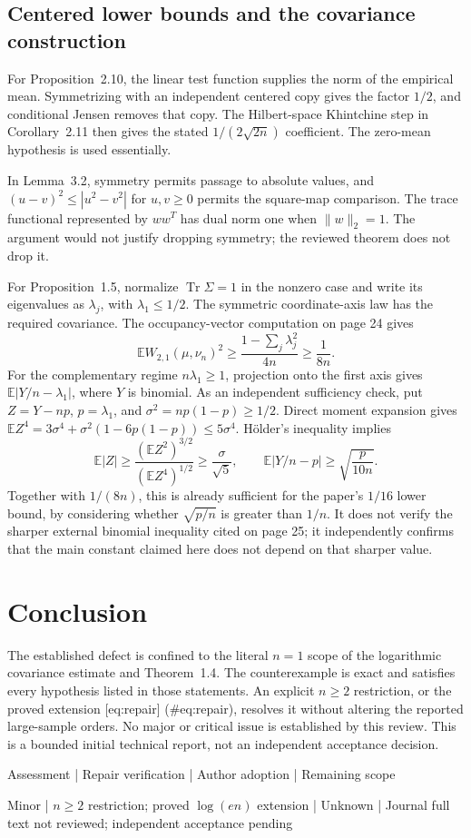 \documentclass[10pt]{article}
\begin{document}
\subsection*{Centered lower bounds and the covariance construction}
For Proposition 2.10, the linear test function supplies the norm of the empirical mean. Symmetrizing with an independent centered copy gives the factor \(1/2\), and conditional Jensen removes that copy. The Hilbert-space Khintchine step in Corollary 2.11 then gives the stated \(1/(2\sqrt{2n})\) coefficient. The zero-mean hypothesis is used essentially.\par
In Lemma 3.2, symmetry permits passage to absolute values, and \((u-v)^2\leq|u^2-v^2|\) for \(u,v\geq0\) permits the square-map comparison. The trace functional represented by \(ww^T\) has dual norm one when \(\|w\|_2=1\). The argument would not justify dropping symmetry; the reviewed theorem does not drop it.\par
For Proposition 1.5, normalize \(\operatorname{Tr}\Sigma=1\) in the nonzero case and write its eigenvalues as \(\lambda_j\), with \(\lambda_1\leq1/2\). The symmetric coordinate-axis law has the required covariance. The occupancy-vector computation on page 24 gives \[\mathbb E W_{2,1}(\mu,\nu_n)^2
 \geq \frac{1-\sum_j\lambda_j^2}{4n}\geq\frac1{8n}.\] For the complementary regime \(n\lambda_1\geq1\), projection onto the first axis gives \(\mathbb E|Y/n-\lambda_1|\), where \(Y\) is binomial. As an independent sufficiency check, put \(Z=Y-np\), \(p=\lambda_1\), and \(\sigma^2=np(1-p)\geq1/2\). Direct moment expansion gives \(\mathbb E Z^4=3\sigma^4+\sigma^2(1-6p(1-p))
\leq5\sigma^4\). Hölder’s inequality implies \[\mathbb E|Z|\geq
 \frac{(\mathbb E Z^2)^{3/2}}{(\mathbb E Z^4)^{1/2}}
 \geq\frac{\sigma}{\sqrt5},
 \qquad
 \mathbb E|Y/n-p|\geq\sqrt{\frac{p}{10n}}.\] Together with \(1/(8n)\), this is already sufficient for the paper’s \(1/16\) lower bound, by considering whether \(\sqrt{p/n}\) is greater than \(1/n\). It does not verify the sharper external binomial inequality cited on page 25; it independently confirms that the main constant claimed here does not depend on that sharper value.\par
\section*{Conclusion}
The established defect is confined to the literal \(n=1\) scope of the logarithmic covariance estimate and Theorem 1.4. The counterexample is exact and satisfies every hypothesis listed in those statements. An explicit \(n\geq2\) restriction, or the proved extension [eq:repair] (\#eq:repair), resolves it without altering the reported large-sample orders. No major or critical issue is established by this review. This is a bounded initial technical report, not an independent acceptance decision.\par
Assessment | Repair verification | Author adoption | Remaining scope\par
Minor | \(n\geq2\) restriction; proved \(\log(en)\) extension | Unknown | Journal full text not reviewed; independent acceptance pending\par
\end{document}
